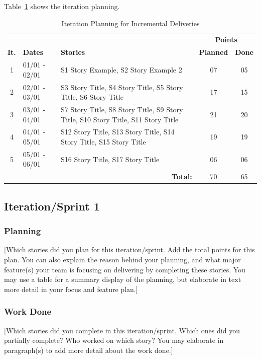 \documentclass{article}
\begin{document}
Table~\ref{tab:it-planning} shows the iteration planning.

\begin{table}[h!]
\centering
\begin{tabular}{c l p{7cm} c c}
\hline
 & & & \multicolumn{2}{c}{\bf Points }  \\
\textbf{It.} & \textbf{Dates} & \textbf{Stories} & \textbf{Planned} & \textbf{Done} \\
\hline
1 & 01/01 - 02/01 & S1 Story Example, S2 Story Example 2 & 07 & 05\\ \hline
2 & 02/01 - 03/01 & S3 Story Title, S4 Story Title, S5 Story Title, S6 Story Title & 17 & 15 \\ \hline
3 & 03/01 - 04/01 & S7 Story Title, S8 Story Title, S9 Story Title, S10 Story Title, S11 Story Title & 21 & 20 \\ \hline
4 & 04/01 - 05/01 & S12 Story Title, S13 Story Title, S14 Story Title, S15 Story Title & 19 & 19 \\ \hline
5 & 05/01 - 06/01 & S16 Story Title, S17 Story Title & 06 & 06 \\ \hline
\multicolumn{3}{r}{\bf Total: } & 70 & 65 \\ \hline
\end{tabular}
\caption{Iteration Planning for Incremental Deliveries}\label{tab:it-planning}
\end{table}

\subsection{Iteration/Sprint 1}
\subsubsection{Planning}
[Which stories did you plan for this iteration/sprint. Add the total points for this plan. You can also explain the reason behind your planning, and what major feature(s) your team is focusing on delivering by completing these stories. You may use a table for a summary display of the planning, but elaborate in text more detail in your focus and feature plan.]

\subsubsection{Work Done}
[Which stories did you complete in this iteration/sprint. Which ones did you partially complete? Who worked on which story? You may elaborate in paragraph(s) to add more detail about the work done.]
\end{document}
